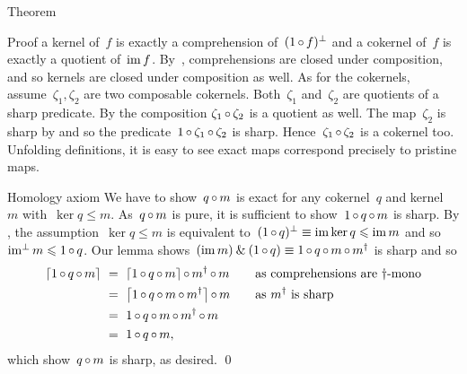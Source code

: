 \documentclass[b]{subfiles}
\begin{document}
\begin{parsec}
\begin{point}{Theorem}
\begin{point}{Proof}
    a kernel of~$f$ is exactly a comprehension of~$(1 \mathop{\circ} f)^\perp$
    and a cokernel of~$f$ is exactly a quotient of~$\operatorname{im} f$.
By~,
    comprehensions are closed under composition,
    and so kernels are closed under composition as well.
As for the cokernels,
    assume~$\zeta_1, \zeta_2$ are two composable cokernels.
Both~$\zeta_1$ and~$\zeta_2$ are quotients of a sharp predicate.
By  the composition  $\zeta_1 \mathop{\circ} \zeta_2$
    is a quotient as well.
The map~$\zeta_2$ is sharp by 
    and so the predicate~$1 \mathop{\circ} \zeta_1 \mathop{\circ} \zeta_2$ is sharp.
Hence~$\zeta_1 \mathop{\circ} \zeta_2$ is a cokernel too.
Unfolding definitions, it is easy to see exact maps correspond precisely
    to pristine maps.
\begin{point}{Homology axiom}%
We have to show~$q \mathop{\circ} m$
    is exact for any cokernel~$q$ and kernel~$m$ with~$\ker q \leq m$.
As~$q \mathop{\circ} m$ is pure,
    it is sufficient to show~$1 \mathop{\circ} q \mathop{\circ} m$ is sharp.
By ,
the assumption~$\ker q \leq m$
    is equivalent to~$(1 \mathop{\circ} q)^\perp \equiv \operatorname{im} \ker q \leqslant \operatorname{im} m$
    and so~$\operatorname{im^\perp} m \leqslant 1 \mathop{\circ} q$.
Our lemma 
    shows~$(\operatorname{im} m) \mathbin{\&} (1 \mathop{\circ} q)
    \equiv 1 \mathop{\circ} q \mathop{\circ} m \mathop{\circ} m^\dagger$ is sharp
    and so
\begin{align*}
    \left\lceil1 \mathop{\circ} q \mathop{\circ} m\right\rceil
    &\ = \ \left\lceil1 \mathop{\circ} q \mathop{\circ} m\right\rceil \mathop{\circ} m^\dagger \mathop{\circ} m 
        &\quad&\text{as comprehensions are~$\dagger$-mono}\\
    &\ = \ \left\lceil1 \mathop{\circ} q \mathop{\circ} m \mathop{\circ} m^\dagger\right\rceil \mathop{\circ} m 
        &&\text{as $m^\dagger$ is sharp} \\
    &\ = \ 1 \mathop{\circ} q  \mathop{\circ}  m \mathop{\circ} m^\dagger \mathop{\circ} m  \\
    &\ = \ 1 \mathop{\circ} q  \mathop{\circ}  m,
\end{align*}
which show~$q \mathop{\circ} m$ is sharp, as desired. \qed
\end{point}
\end{point}
\end{point}
\end{parsec}
\end{document}
